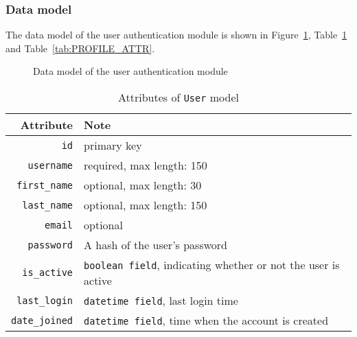 \subsubsection{Data model}
The data model of the user authentication module is shown in
Figure~\ref{fig:AUTH_ER}, Table~\ref{tab:USR_ATTR} and
Table~\ref{tab:PROFILE_ATTR}.

\bigskip

\begin{figure}[ht]
    \centering

    \usetikzlibrary{er}

    \caption{Data model of the user authentication module}
    \label{fig:AUTH_ER}
\end{figure}


\begin{table}[ht]
    \centering
    \caption{Attributes of \texttt{User} model}
    \label{tab:USR_ATTR}
    \renewcommand{\arraystretch}{1.3}
    \begin{tabular}[ht]{r|l}
        \hline
        Attribute & Note \\
        \hline
        \hline
        \texttt{id} & primary key \\
        \hline
        \texttt{username} &  required, max length: 150 \\
        \hline
        \texttt{first\_name} &  optional, max length: 30 \\
        \hline
        \texttt{last\_name} &  optional, max length: 150 \\
        \hline
        \texttt{email} & optional\\
        \hline
        \texttt{password} & A hash of the user's password \\
        \hline
        \texttt{is\_active} & \texttt{boolean field}, indicating whether or not the user
            is active \\
        \hline
        \texttt{last\_login} & \texttt{datetime field}, last login time \\
        \hline
        \texttt{date\_joined} & \texttt{datetime field}, time when the account is created \\
        \hline
    \end{tabular}
    \renewcommand{\arraystretch}{1}
\end{table}

